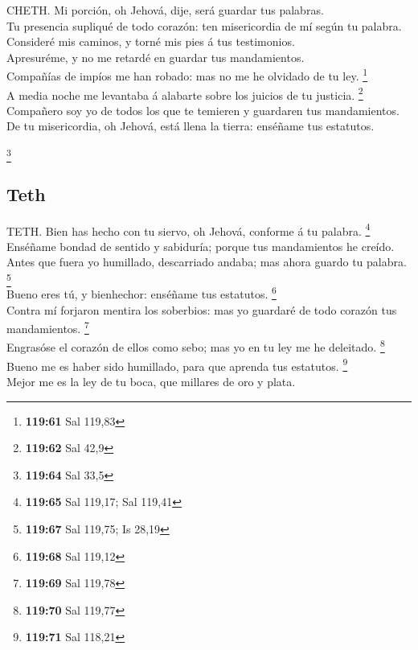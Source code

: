  CHETH. Mi porción, oh Jehová, dije, será guardar tus
palabras.\\
 Tu presencia supliqué de todo corazón: ten misericordia
de mí según tu palabra.\\
 Consideré mis caminos, y torné mis pies á tus
testimonios.\\
 Apresuréme, y no me retardé en guardar tus
mandamientos.\\
 Compañías de impíos me han robado: mas no me he olvidado
de tu ley. \footnote{\textbf{119:61} Sal 119,83}\\
 A media noche me levantaba á alabarte sobre los juicios
de tu justicia. \footnote{\textbf{119:62} Sal 42,9}\\
 Compañero soy yo de todos los que te temieren y
guardaren tus mandamientos.\\
 De tu misericordia, oh Jehová, está llena la tierra:
enséñame tus estatutos.

\footnote{\textbf{119:64} Sal 33,5}

\hypertarget{teth}{%
\subsection{Teth}\label{teth}}

 TETH. Bien has hecho con tu siervo, oh Jehová, conforme
á tu palabra. \footnote{\textbf{119:65} Sal 119,17; Sal 119,41}\\
 Enséñame bondad de sentido y sabiduría; porque tus
mandamientos he creído.\\
 Antes que fuera yo humillado, descarriado andaba; mas
ahora guardo tu palabra. \footnote{\textbf{119:67} Sal 119,75; Is 28,19}\\
 Bueno eres tú, y bienhechor: enséñame tus estatutos.
\footnote{\textbf{119:68} Sal 119,12}\\
 Contra mí forjaron mentira los soberbios: mas yo
guardaré de todo corazón tus mandamientos. \footnote{\textbf{119:69} Sal
  119,78}\\
 Engrasóse el corazón de ellos como sebo; mas yo en tu
ley me he deleitado. \footnote{\textbf{119:70} Sal 119,77}\\
 Bueno me es haber sido humillado, para que aprenda tus
estatutos. \footnote{\textbf{119:71} Sal 118,21}\\
 Mejor me es la ley de tu boca, que millares de oro y
plata.

